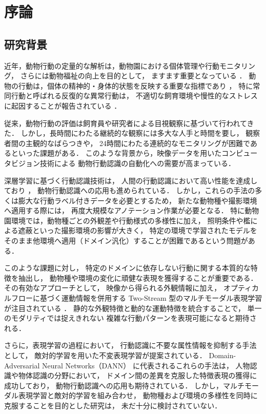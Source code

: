 \chapter{序論}

\section{研究背景}
近年，動物行動の定量的な解析は，動物園における個体管理や行動モニタリング，
さらには動物福祉の向上を目的として，
ますます重要となっている \cite{mellor2017updating}．
動物の行動は，個体の精神的・身体的状態を反映する重要な指標であり \cite{broom1986indicators}，
特に常同行動と呼ばれる反復的な異常行動は，
不適切な飼育環境や慢性的なストレスに起因することが報告されている \cite{mason1991stereotypies}．

従来，動物行動の評価は飼育員や研究者による目視観察に基づいて行われてきた．
しかし，長時間にわたる継続的な観察には多大な人手と時間を要し，
観察者間の主観的なばらつきや，
24時間にわたる連続的なモニタリングが困難であるといった課題がある．
このような背景から，映像データを用いたコンピュータビジョン技術による
動物行動認識の自動化への需要が高まっている．

深層学習に基づく行動認識技術は，
人間の行動認識において高い性能を達成しており \cite{carreira2017quo}，
動物行動認識への応用も進められている．
しかし，これらの手法の多くは膨大な行動ラベル付きデータを必要とするため，
新たな動物種や撮影環境へ適用する際には，
再度大規模なアノテーション作業が必要となる．
特に動物園環境では，動物種ごとの外観差や行動様式の多様性に加え，
照明条件や檻による遮蔽といった撮影環境の影響が大きく，
特定の環境で学習されたモデルを
そのまま他環境へ適用（ドメイン汎化）することが困難であるという問題がある．

このような課題に対し，
特定のドメインに依存しない行動に関する本質的な特徴を抽出し，
動物種や環境の変化に頑健な表現を獲得することが重要である．
その有効なアプローチとして，
映像から得られる外観情報に加え，
オプティカルフローに基づく運動情報を併用する
Two-Stream 型のマルチモーダル表現学習が注目されている \cite{simonyan2014two}．
静的な外観特徴と動的な運動特徴を統合することで，
単一のモダリティでは捉えきれない
複雑な行動パターンを表現可能になると期待される．

さらに，表現学習の過程において，
行動認識に不要な属性情報を抑制する手法として，
敵対的学習を用いた不変表現学習が提案されている．
Domain-Adversarial Neural Networks（DANN）\cite{ganin2016domain} に代表されるこれらの手法は，
人物認識や物体認識の分野において，
ドメイン間の差異を克服した特徴表現の獲得に成功しており，
動物行動認識への応用も期待されている．
しかし，マルチモーダル表現学習と敵対的学習を組み合わせ，
動物種および環境の多様性を同時に克服することを目的とした研究は，
未だ十分に検討されていない．

